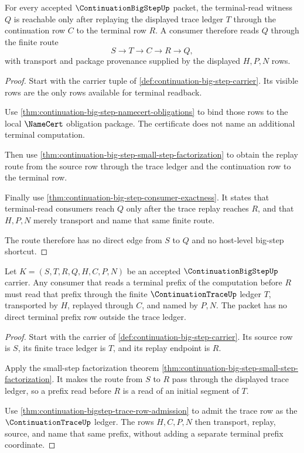 \begin{theorem}
\label{thm:continuation-bigstep-terminal-row-readback}
For every accepted $\ContinuationBigStepUp$ packet, the terminal-read witness
$Q$ is reachable only after replaying the displayed trace ledger $T$ through
the continuation row $C$ to the terminal row $R$. A consumer therefore reads
$Q$ through the finite route
$$
S \longrightarrow T \longrightarrow C \longrightarrow R \longrightarrow Q,
$$
with transport and package provenance supplied by the displayed $H,P,N$ rows.
\end{theorem}
\begin{proof}
Start with the carrier tuple of
\autoref{def:continuation-big-step-carrier}. Its visible rows are the only
rows available for terminal readback.

Use \autoref{thm:continuation-big-step-namecert-obligations} to bind those
rows to the local $\NameCert$ obligation package. The certificate does not
name an additional terminal computation.

Then use \autoref{thm:continuation-big-step-small-step-factorization} to
obtain the replay route from the source row through the trace ledger and the
continuation row to the terminal row.

Finally use \autoref{thm:continuation-big-step-consumer-exactness}. It states
that terminal-read consumers reach $Q$ only after the trace replay reaches
$R$, and that $H,P,N$ merely transport and name that same finite route.

The route therefore has no direct edge from $S$ to $Q$ and no host-level
big-step shortcut.
\end{proof}

\begin{theorem}
\label{thm:continuation-bigstep-trace-prefix-readback}
Let $K=(S,T,R,Q,H,C,P,N)$ be an accepted $\ContinuationBigStepUp$ carrier. Any
consumer that reads a terminal prefix of the computation before $R$ must read
that prefix through the finite $\ContinuationTraceUp$ ledger $T$, transported by
$H$, replayed through $C$, and named by $P,N$. The packet has no direct terminal
prefix row outside the trace ledger.
\end{theorem}
\begin{proof}
Start with the carrier of
\autoref{def:continuation-big-step-carrier}. Its source row is $S$, its finite
trace ledger is $T$, and its replay endpoint is $R$.

Apply the small-step factorization theorem
\autoref{thm:continuation-big-step-small-step-factorization}. It makes the
route from $S$ to $R$ pass through the displayed trace ledger, so a prefix read
before $R$ is a read of an initial segment of $T$.

Use \autoref{thm:continuation-bigstep-trace-row-admission} to admit the trace
row as the $\ContinuationTraceUp$ ledger. The rows $H,C,P,N$ then transport,
replay, source, and name that same prefix, without adding a separate terminal
prefix coordinate.
\end{proof}

